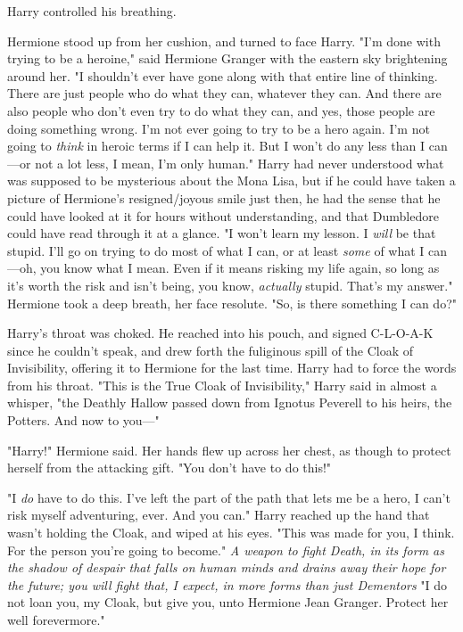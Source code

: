Harry controlled his breathing.

Hermione stood up from her cushion, and turned to face Harry. "I'm done with
trying to be a heroine," said Hermione Granger with the eastern sky brightening
around her. "I shouldn't ever have gone along with that entire line of
thinking. There are just people who do what they can, whatever they can. And
there are also people who don't even try to do what they can, and yes, those
people are doing something wrong. I'm not ever going to try to be a hero again.
I'm not going to \emph{think} in heroic terms if I can help it. But I won't do
any less than I can—or not a lot less, I mean, I'm only human." Harry had
never understood what was supposed to be mysterious about the Mona Lisa, but if
he could have taken a picture of Hermione's resigned/joyous smile just then, he
had the sense that he could have looked at it for hours without understanding,
and that Dumbledore could have read through it at a glance. "I won't learn my
lesson. I \emph{will} be that stupid. I'll go on trying to do most of what I
can, or at least \emph{some} of what I can—oh, you know what I mean. Even if
it means risking my life again, so long as it's worth the risk and isn't being,
you know, \emph{actually} stupid. That's my answer." Hermione took a deep
breath, her face resolute. "So, is there something I can do?"

Harry's throat was choked. He reached into his pouch, and signed C-L-O-A-K
since he couldn't speak, and drew forth the fuliginous spill of the Cloak of
Invisibility, offering it to Hermione for the last time. Harry had to force the
words from his throat. "This is the True Cloak of Invisibility," Harry said in
almost a whisper, "the Deathly Hallow passed down from Ignotus Peverell to his
heirs, the Potters. And now to you—"

"Harry!" Hermione said. Her hands flew up across her chest, as though to
protect herself from the attacking gift. "You don't have to do this!"

"I \emph{do} have to do this. I've left the part of the path that lets me be a
hero, I can't risk myself adventuring, ever. And you{\el} can." Harry
reached up the hand that wasn't holding the Cloak, and wiped at his eyes. "This
was made for you, I think. For the person you're going to become." \emph{A
weapon to fight Death, in its form as the shadow of despair that falls on human
minds and drains away their hope for the future; you will fight that, I expect,
in more forms than just Dementors{\el}} "I do not loan you, my Cloak, but
give you, unto Hermione Jean Granger. Protect her well forevermore."

